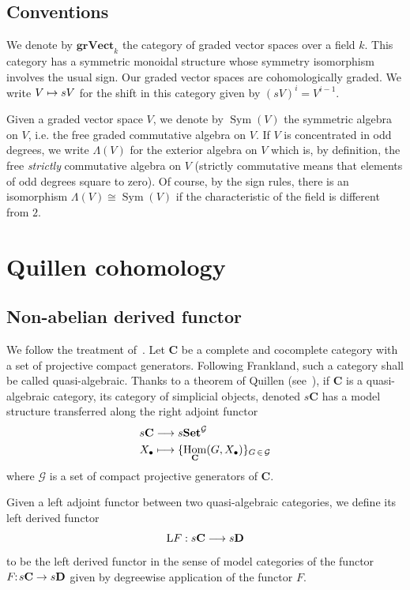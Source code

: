 \documentclass[AHL,Unicode,longabstracts,published]{cedram}
\DeclareMathOperator{\Hom}{Hom}
\DeclareMathOperator{\sym}{Sym}
\newcommand{\grVect}{\mathbf{grVect}}
\newcommand{\bSet}{\mathbf{Set}}
\newcommand{\bfC}{\mathbf{C}}
\newcommand{\bfD}{\mathbf{D}}
\renewcommand{\L}{\mathrm{L}}
\newcommand{\clG}{\mathcal{G}}
\renewcommand*{\to}{\mathchoice{\longrightarrow}{\rightarrow}{\rightarrow}{\rightarrow}}
\let\oldmapsto\mapsto
\renewcommand*{\mapsto}{\mathchoice{\longmapsto}{\oldmapsto}{\oldmapsto}{\oldmapsto}}
\begin{document}
\subsection*{Conventions}

We denote by $\grVect_k$ the category of graded vector spaces over a field $k$. This category has a symmetric monoidal structure whose symmetry isomorphism involves the usual sign. Our graded vector spaces are cohomologically graded. We write $V\mapsto sV$ for the shift in this category given by $(sV)^i=V^{i-1}$.

Given a graded vector space $V$, we denote by $\sym(V)$ the symmetric algebra on $V$, i.e. the free graded commutative algebra on $V$. If $V$ is concentrated in odd degrees, we write $\Lambda(V)$ for the exterior algebra on $V$ which is, by definition, the free \emph{strictly} commutative algebra on $V$ (strictly commutative means that elements of odd degrees square to zero). Of course, by the sign rules, there is an isomorphism $\Lambda(V)\cong \sym(V)$ if the characteristic of the field is different from $2$.



\section{Quillen cohomology}

\subsection{Non-abelian derived functor}

We follow the treatment of~\cite{franklandbehavior}. Let $\bfC$ be a complete and cocomplete category with a set of projective compact generators. Following Frankland, such a category shall be called quasi-algebraic. Thanks to a theorem of Quillen (see~\cite[Theorem~2.4]{quillenhomotopical}), if $\bfC$ is a quasi-algebraic category, its category of simplicial objects, denoted $s\bfC$ has a model structure transferred along the right adjoint functor
\begin{align*}
s\bfC&\to s\bSet^{\clG}\\
X_\bullet&\mapsto \{\Hom_{\bfC}(G,X_\bullet)\}_{G\,\in\,\clG}
\end{align*}
where $\clG$ is a set of compact projective generators of $\bfC$.

Given a left adjoint functor between two quasi-algebraic categories, we define its left derived functor
\[
\L F: s\bfC\to s\bfD
\]
to be the left derived functor in the sense of model categories of the functor $F\!\!:\! s\bfC\to s\bfD$ given by degreewise application of the functor $F$.
\end{document}
